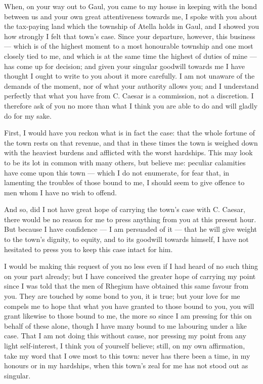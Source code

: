 

 When, on your way out to Gaul, you came to my house in keeping with the bond between us and your own great attentiveness towards me, I spoke with you about the tax-paying land which the township of Atella holds in Gaul, and I showed you how strongly I felt that town's case. Since your departure, however, this business --- which is of the highest moment to a most honourable township and one most closely tied to me, and which is at the same time the highest of duties of mine --- has come up for decision; and given your singular goodwill towards me I have thought I ought to write to you about it more carefully. I am not unaware of the demands of the moment, nor of what your authority allows you; and I understand perfectly that what you have from C. Caesar is a commission, not a discretion. I therefore ask of you no more than what I think you are able to do and will gladly do for my sake.

 First, I would have you reckon what is in fact the case: that the whole fortune of the town rests on that revenue, and that in these times the town is weighed down with the heaviest burdens and afflicted with the worst hardships. This may look to be its lot in common with many others, but believe me: peculiar calamities have come upon this town --- which I do not enumerate, for fear that, in lamenting the troubles of those bound to me, I should seem to give offence to men whom I have no wish to offend.

 And so, did I not have great hope of carrying the town's case with C. Caesar, there would be no reason for me to press anything from you at this present hour. But because I have confidence --- I am persuaded of it --- that he will give weight to the town's dignity, to equity, and to its goodwill towards himself, I have not hesitated to press you to keep this case intact for him.

 I would be making this request of you no less even if I had heard of no such thing on your part already; but I have conceived the greater hope of carrying my point since I was told that the men of Rhegium have obtained this same favour from you. They are touched by some bond to you, it is true; but your love for me compels me to hope that what you have granted to those bound to you, you will grant likewise to those bound to me, the more so since I am pressing for this on behalf of these alone, though I have many bound to me labouring under a like case. That I am not doing this without cause, nor pressing my point from any light self-interest, I think you of yourself believe; still, on my own affirmation, take my word that I owe most to this town: never has there been a time, in my honours or in my hardships, when this town's zeal for me has not stood out as singular.

